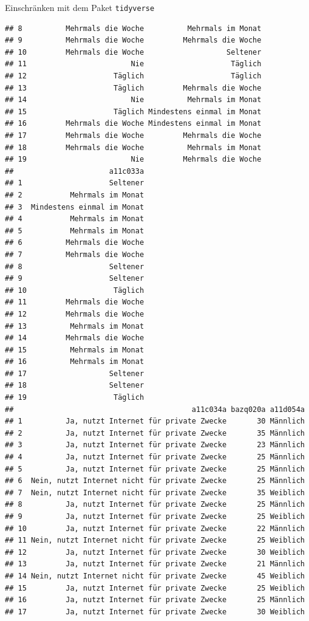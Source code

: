 \documentclass[ignorenonframetext,]{beamer}
\begin{document}
\begin{frame}[fragile]{Einschränken mit dem Paket \texttt{tidyverse}}
\begin{verbatim}
## 8          Mehrmals die Woche          Mehrmals im Monat
## 9          Mehrmals die Woche         Mehrmals die Woche
## 10         Mehrmals die Woche                   Seltener
## 11                        Nie                    Täglich
## 12                    Täglich                    Täglich
## 13                    Täglich         Mehrmals die Woche
## 14                        Nie          Mehrmals im Monat
## 15                    Täglich Mindestens einmal im Monat
## 16         Mehrmals die Woche Mindestens einmal im Monat
## 17         Mehrmals die Woche         Mehrmals die Woche
## 18         Mehrmals die Woche          Mehrmals im Monat
## 19                        Nie         Mehrmals die Woche
##                      a11c033a
## 1                    Seltener
## 2           Mehrmals im Monat
## 3  Mindestens einmal im Monat
## 4           Mehrmals im Monat
## 5           Mehrmals im Monat
## 6          Mehrmals die Woche
## 7          Mehrmals die Woche
## 8                    Seltener
## 9                    Seltener
## 10                    Täglich
## 11         Mehrmals die Woche
## 12         Mehrmals die Woche
## 13          Mehrmals im Monat
## 14         Mehrmals die Woche
## 15          Mehrmals im Monat
## 16          Mehrmals im Monat
## 17                   Seltener
## 18                   Seltener
## 19                    Täglich
##                                         a11c034a bazq020a a11d054a
## 1          Ja, nutzt Internet für private Zwecke       30 Männlich
## 2          Ja, nutzt Internet für private Zwecke       35 Männlich
## 3          Ja, nutzt Internet für private Zwecke       23 Männlich
## 4          Ja, nutzt Internet für private Zwecke       25 Männlich
## 5          Ja, nutzt Internet für private Zwecke       25 Männlich
## 6  Nein, nutzt Internet nicht für private Zwecke       25 Männlich
## 7  Nein, nutzt Internet nicht für private Zwecke       35 Weiblich
## 8          Ja, nutzt Internet für private Zwecke       25 Männlich
## 9          Ja, nutzt Internet für private Zwecke       25 Weiblich
## 10         Ja, nutzt Internet für private Zwecke       22 Männlich
## 11 Nein, nutzt Internet nicht für private Zwecke       25 Weiblich
## 12         Ja, nutzt Internet für private Zwecke       30 Weiblich
## 13         Ja, nutzt Internet für private Zwecke       21 Männlich
## 14 Nein, nutzt Internet nicht für private Zwecke       45 Weiblich
## 15         Ja, nutzt Internet für private Zwecke       25 Weiblich
## 16         Ja, nutzt Internet für private Zwecke       25 Männlich
## 17         Ja, nutzt Internet für private Zwecke       30 Weiblich

\end{verbatim}
\end{frame}
\end{document}
